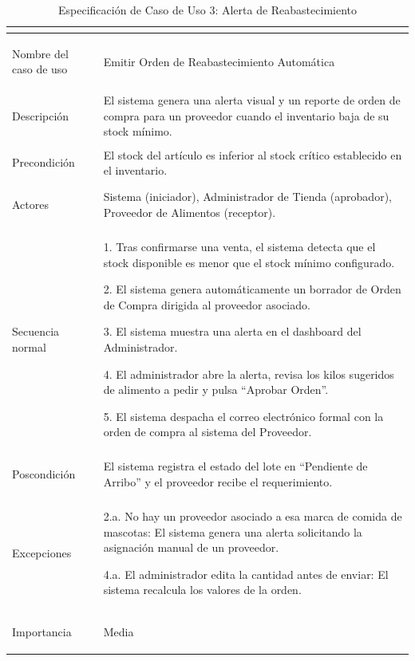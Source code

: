 \documentclass[11pt,a4paper]{article}
\begin{document}
\newpage
\begin{table}[H]
    \centering
    \small
    \renewcommand{\arraystretch}{1.4}
    \begin{tabularx}{\textwidth}{|>{\bfseries\raggedright\arraybackslash}p{4cm}|L|}
        \hline
          \\
        \hline
        Nombre del caso de uso & Emitir Orden de Reabastecimiento Automática \\
        \hline
        Descripción & El sistema genera una alerta visual y un reporte de orden de compra para un proveedor cuando el inventario baja de su stock mínimo. \\
        \hline
        Precondición & El stock del artículo es inferior al stock crítico establecido en el inventario. \\
        \hline
        Actores & Sistema (iniciador), Administrador de Tienda (aprobador), Proveedor de Alimentos (receptor). \\
        \hline
        Secuencia normal & 
        1. Tras confirmarse una venta, el sistema detecta que el stock disponible es menor que el stock mínimo configurado. \par
        2. El sistema genera automáticamente un borrador de Orden de Compra dirigida al proveedor asociado. \par
        3. El sistema muestra una alerta en el dashboard del Administrador. \par
        4. El administrador abre la alerta, revisa los kilos sugeridos de alimento a pedir y pulsa ``Aprobar Orden''. \par
        5. El sistema despacha el correo electrónico formal con la orden de compra al sistema del Proveedor. \\
        \hline
        Poscondición & El sistema registra el estado del lote en ``Pendiente de Arribo'' y el proveedor recibe el requerimiento. \\
        \hline
        Excepciones & 
        2.a. No hay un proveedor asociado a esa marca de comida de mascotas: El sistema genera una alerta solicitando la asignación manual de un proveedor. \par
        4.a. El administrador edita la cantidad antes de enviar: El sistema recalcula los valores de la orden. \\
        \hline
        Importancia & Media \\
        \hline
    \end{tabularx}
    \caption{Especificación de Caso de Uso 3: Alerta de Reabastecimiento}
    \label{tab:especificacion_cu3}
\end{table}
\end{document}
